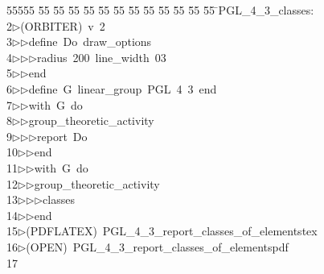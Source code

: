 %
%
\begin{tabbing}
55555 \= 55 \= 55 \= 55 \= 55 \= 55 \= 55 \= 55 \= 55 \= 55 \= 55 \= 55 \= 55 \= \>PGL\_4\_3\_classes:\\[0pt]
2\>$\triangleright$\>(ORBITER)\ v\ 2\ \\[0pt]
3\>$\triangleright$\>$\triangleright$\>define\ Do\ draw\_options\ \\[0pt]
4\>$\triangleright$\>$\triangleright$\>$\triangleright$\>radius\ 200\ line\_width\ 03\ \\[0pt]
5\>$\triangleright$\>$\triangleright$\>end\ \\[0pt]
6\>$\triangleright$\>$\triangleright$\>define\ G\ linear\_group\ PGL\ 4\ 3\ end\ \\[0pt]
7\>$\triangleright$\>$\triangleright$\>with\ G\ do\ \\[0pt]
8\>$\triangleright$\>$\triangleright$\>group\_theoretic\_activity\ \\[0pt]
9\>$\triangleright$\>$\triangleright$\>$\triangleright$\>report\ Do\ \\[0pt]
10\>$\triangleright$\>$\triangleright$\>end\ \\[0pt]
11\>$\triangleright$\>$\triangleright$\>with\ G\ do\ \\[0pt]
12\>$\triangleright$\>$\triangleright$\>group\_theoretic\_activity\ \\[0pt]
13\>$\triangleright$\>$\triangleright$\>$\triangleright$\>classes\ \\[0pt]
14\>$\triangleright$\>$\triangleright$\>end\\[0pt]
15\>$\triangleright$\>(PDFLATEX)\ PGL\_4\_3\_report\_classes\_of\_elementstex\\[0pt]
16\>$\triangleright$\>(OPEN)\ PGL\_4\_3\_report\_classes\_of\_elementspdf\\[0pt]
17\>\end{tabbing}
